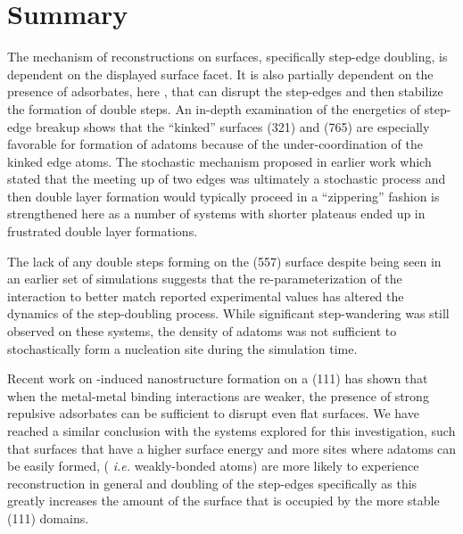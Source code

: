 \section{Summary}
The mechanism of reconstructions on  surfaces, specifically step-edge
doubling, is dependent on the displayed surface facet. It is also
partially dependent on the presence of adsorbates, here , that can 
disrupt the step-edges and then stabilize the formation of double steps. An in-depth
examination of the energetics of step-edge breakup shows that the ``kinked''
surfaces (321) and (765) are especially favorable for formation of adatoms
because of the under-coordination of the kinked edge atoms. The stochastic
mechanism proposed in earlier work which stated that the meeting up of two
edges was ultimately a stochastic process and then double layer formation would
typically proceed in a ``zippering'' fashion is strengthened here as a number of
systems with shorter plateaus ended up in frustrated double layer formations.

The lack of any double steps forming on the (557) surface despite being seen in
an earlier set of simulations suggests that the re-parameterization of the
 interaction to better match reported experimental values has
altered the dynamics of the step-doubling process.  While significant
step-wandering was still observed on these systems, the density of adatoms was
not sufficient to stochastically form a nucleation site during the simulation
time.

Recent work on -induced nanostructure formation on a  (111) has
shown that when the metal-metal binding interactions are weaker, the presence
of strong repulsive adsorbates can be sufficient to disrupt even flat
surfaces.\citep{Eren:2016qt} We have reached a similar conclusion with the
 systems explored for this investigation, such that surfaces that have a
higher surface energy and more sites where adatoms can be easily formed, ({\em
i.e.} weakly-bonded atoms) are more likely to experience reconstruction in
general and doubling of the step-edges specifically as this greatly increases
the amount of the surface that is occupied by the more stable (111) domains.

